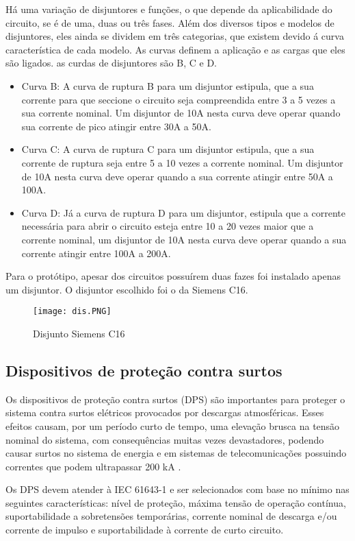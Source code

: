 Há uma variação de disjuntores e funções, o que depende da aplicabilidade do circuito, se é de uma, duas ou três fases. Além dos diversos tipos e modelos de disjuntores, eles ainda se dividem em três categorias, que existem devido á curva característica de cada modelo. As curvas definem a aplicação e as cargas que eles são ligados. as curdas de disjuntores são B, C e D.
\begin{itemize}
\item Curva B: A curva de ruptura B para um disjuntor estipula, que a sua corrente para que seccione o circuito seja compreendida entre 3 a 5 vezes a sua corrente nominal. Um disjuntor de 10A nesta curva deve operar quando sua corrente de pico atingir entre 30A a 50A.
\item Curva C: A curva de ruptura C para um disjuntor estipula, que a sua corrente de ruptura seja entre 5 a 10 vezes a corrente nominal. Um disjuntor de 10A nesta curva deve operar quando a sua corrente atingir entre 50A a 100A.
\item Curva D: Já a curva de ruptura D para um disjuntor, estipula que a corrente necessária para abrir o circuito esteja entre 10 a 20 vezes maior que a corrente nominal, um disjuntor de 10A nesta curva deve operar quando a sua corrente atingir entre 100A a 200A.
\end{itemize}


Para o protótipo, apesar dos circuitos possuírem duas fazes foi instalado apenas um disjuntor. O disjuntor escolhido foi o da Siemens C16.


\begin{figure}[H]
\centering
\texttt{[image: dis.PNG]}
    \caption{Disjunto Siemens C16}
\label{fig:disjuntor}
\end{figure}
\FloatBarrier

\subsection{Dispositivos de proteção contra surtos}

Os dispositivos de proteção contra surtos (DPS) são importantes para proteger o sistema contra surtos elétricos provocados por descargas atmosféricas. Esses efeitos causam, por um período curto de tempo, uma elevação brusca na tensão nominal do sistema, com consequências muitas vezes devastadores, podendo causar surtos no sistema de energia e em sistemas de telecomunicações possuindo correntes que podem ultrapassar 200 kA \cite{surtos}.

Os DPS devem atender à IEC 61643-1 \cite{surtos} e ser selecionados com base no mínimo nas seguintes características: nível de proteção, máxima tensão de operação contínua, suportabilidade a sobretensões temporárias, corrente nominal de descarga e/ou corrente de impulso e suportabilidade à corrente de curto circuito.
 
